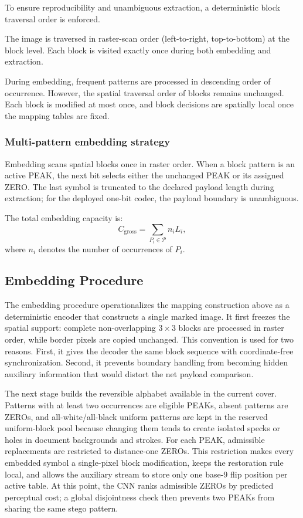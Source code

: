 To ensure reproducibility and unambiguous extraction, a deterministic block traversal order is enforced.

The image is traversed in raster-scan order (left-to-right, top-to-bottom) at the block level.
Each block is visited exactly once during both embedding and extraction.

During embedding, frequent patterns are processed in descending order of occurrence.
However, the spatial traversal order of blocks remains unchanged.
\RevisionAddBegin
Each block is modified at most once, and block decisions are spatially local
once the mapping tables are fixed.
\RevisionAddEnd

\subsubsection*{Multi-pattern embedding strategy}
\label{subsec:multi_pattern}

Embedding scans spatial blocks once in raster order. When a block pattern is
an active PEAK, the next bit selects either the unchanged PEAK or its assigned
ZERO. The last symbol is truncated to the declared payload length during
\RevisionAddBegin
extraction; for the deployed one-bit codec, the payload boundary is
unambiguous.
\RevisionAddEnd

The total embedding capacity is:
\begin{equation}
C_{\text{gross}} = \sum_{P_i \in \mathcal{P}} n_i L_i,
\label{eq:gross-capacity}
\end{equation}
where $n_i$ denotes the number of occurrences of $P_i$.

\subsection{Embedding Procedure}
\RevisionAddBegin
The embedding procedure operationalizes the mapping construction above as a
deterministic encoder that constructs a single marked image. It first freezes
the spatial support: complete non-overlapping $3\times3$ blocks are processed
in raster order, while border pixels are copied unchanged.
This convention is used for two reasons. First, it gives the decoder the same
block sequence with coordinate-free synchronization. Second, it prevents boundary
handling from becoming hidden auxiliary information that would distort the net
payload comparison.

The next stage builds the reversible alphabet available in the current cover.
Patterns with at least two occurrences are eligible PEAKs, absent patterns are
ZEROs, and all-white/all-black uniform patterns are kept in the reserved
uniform-block pool because changing them tends to create isolated specks or holes in
document backgrounds and strokes. For each PEAK, admissible replacements are
restricted to distance-one ZEROs. This restriction makes every embedded symbol a
single-pixel block modification, keeps the restoration rule local, and allows
the auxiliary stream to store only one base-9 flip position per active table.
At this point, the CNN ranks admissible ZEROs by predicted perceptual cost;
a global disjointness check then prevents two PEAKs from sharing the same
stego pattern.

